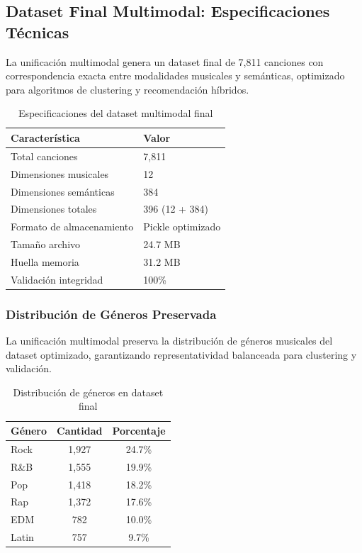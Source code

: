 \documentclass[12pt,a4paper]{article}
\begin{document}
\subsection{Dataset Final Multimodal: Especificaciones Técnicas}

La unificación multimodal genera un dataset final de 7,811 canciones con correspondencia exacta entre modalidades musicales y semánticas, optimizado para algoritmos de clustering y recomendación híbridos.

\begin{table}[h]
\centering
\caption{Especificaciones del dataset multimodal final}
\begin{tabular}{@{}ll@{}}
\toprule
\textbf{Característica} & \textbf{Valor} \\
\midrule
Total canciones & 7,811 \\
Dimensiones musicales & 12 \\
Dimensiones semánticas & 384 \\
Dimensiones totales & 396 (12 + 384) \\
Formato de almacenamiento & Pickle optimizado \\
Tamaño archivo & 24.7 MB \\
Huella memoria & 31.2 MB \\
Validación integridad & 100\% \\
\bottomrule
\end{tabular}
\end{table}

\subsubsection{Distribución de Géneros Preservada}

La unificación multimodal preserva la distribución de géneros musicales del dataset optimizado, garantizando representatividad balanceada para clustering y validación.

\begin{table}[h]
\centering
\caption{Distribución de géneros en dataset final}
\begin{tabular}{@{}lcc@{}}
\toprule
\textbf{Género} & \textbf{Cantidad} & \textbf{Porcentaje} \\
\midrule
Rock & 1,927 & 24.7\% \\
R\&B & 1,555 & 19.9\% \\
Pop & 1,418 & 18.2\% \\
Rap & 1,372 & 17.6\% \\
EDM & 782 & 10.0\% \\
Latin & 757 & 9.7\% \\
\bottomrule
\end{tabular}
\end{table}
\end{document}
